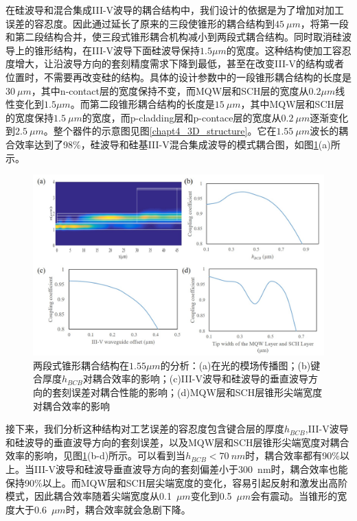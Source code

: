 在硅波导和混合集成III-V波导的耦合结构中，我们设计的依据是为了增加对加工误差的容忍度。因此通过延长了原来的三段使锥形的耦合结构到$45~\mu m$，将第一段和第二段结构合并，使三段式锥形耦合机构减小到两段式耦合结构。同时取消硅波导上的锥形结构，在III-V波导下面硅波导保持$1.5 \mu m$的宽度。这种结构使加工容忍度增大，让沿波导方向的套刻精度需求下降到最低，甚至在改变III-V的结构或者位置时，不需要再改变硅的结构。具体的设计参数中的一段锥形耦合结构的长度是$30~\mu m$，其中n-contact层的宽度保持不变，而MQW层和SCH层的宽度从$0.2 \mu m$线性变化到$1.5 \mu m$。而第二段锥形耦合结构的长度是$15~\mu m$，其中MQW层和SCH层的宽度保持$1.5~\mu m$的宽度，而p-cladding层和p-contace层的宽度从$0.2~\mu m$逐渐变化到$2.5~\mu m$。整个器件的示意图见图\ref{chapt4_3D_structure}。它在$1.55~\mu m$波长的耦合效率达到了98\%，硅波导和硅基III-V混合集成波导的模式耦合图，如图\ref{chapt4_taper_performance}(a)所示。
\begin{figure}[h]
	\centering
	\includegraphics[width=14cm]{./Pictures/chapt4_taper_performance.jpg}
	\caption{两段式锥形耦合结构在$1.55 \mu m$的分析：(a)在光的模场传播图；(b)键合厚度$h_{BCB}$对耦合效率的影响；(c)III-V波导和硅波导的垂直波导方向的套刻误差对耦合性能的影响；(d)MQW层和SCH层锥形尖端宽度对耦合效率的影响}
	\label{chapt4_taper_performance}
\end{figure}
接下来，我们分析这种结构对工艺误差的容忍度包含键合层的厚度$h_{BCB}$,III-V波导和硅波导的垂直波导方向的套刻误差，以及MQW层和SCH层锥形尖端宽度对耦合效率的影响，见图\ref{chapt4_taper_performance}(b-d)所示。可以看到当$h_{BCB} < 70 ~nm$时，耦合效率都有90\%以上。当III-V波导和硅波导垂直波导方向的套刻偏差小于300~nm时，耦合效率也能保持90\%以上。而MQW层和SCH层尖端宽度的变化，容易引起反射和激发出高阶模式，因此耦合效率随着尖端宽度从0.1~$\mu m$变化到0.5~$\mu m$会有震动。当锥形的宽度大于0.6~$\mu m$时，耦合效率就会急剧下降。

